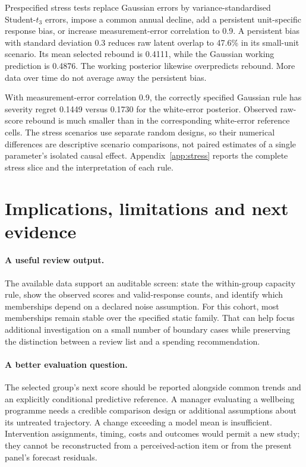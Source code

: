 \documentclass[11pt,letterpaper]{article}
\begin{document}
Prespecified stress tests replace Gaussian errors by variance-standardised Student-$t_3$ errors, impose a common annual decline, add a persistent unit-specific response bias, or increase measurement-error correlation to 0.9. A persistent bias with standard deviation 0.3 reduces raw latent overlap to 47.6\% in its small-unit scenario. Its mean selected rebound is 0.4111, while the Gaussian working prediction is 0.4876. The working posterior likewise overpredicts rebound. More data over time do not average away the persistent bias.

With measurement-error correlation 0.9, the correctly specified Gaussian rule has severity regret 0.1449 versus 0.1730 for the white-error posterior. Observed raw-score rebound is much smaller than in the corresponding white-error reference cells. The stress scenarios use separate random designs, so their numerical differences are descriptive scenario comparisons, not paired estimates of a single parameter's isolated causal effect. Appendix~\ref{app:stress} reports the complete stress slice and the interpretation of each rule.

\section{Implications, limitations and next evidence}
\paragraph{A useful review output.}
The available data support an auditable screen: state the within-group capacity rule, show the observed scores and valid-response counts, and identify which memberships depend on a declared noise assumption. For this cohort, most memberships remain stable over the specified static family. That can help focus additional investigation on a small number of boundary cases while preserving the distinction between a review list and a spending recommendation.

\paragraph{A better evaluation question.}
The selected group's next score should be reported alongside common trends and an explicitly conditional predictive reference. A manager evaluating a wellbeing programme needs a credible comparison design or additional assumptions about its untreated trajectory. A change exceeding a model mean is insufficient. Intervention assignments, timing, costs and outcomes would permit a new study; they cannot be reconstructed from a perceived-action item or from the present panel's forecast residuals.
\end{document}
